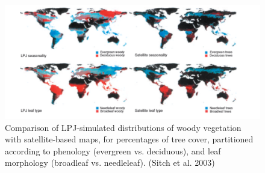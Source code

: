 \documentclass[12pt,oneside]{book}
\begin{document}
\begin{figure}

{\centering \includegraphics[width=0.8\linewidth]{figures/chap6/f66_LPJ_comparison_sitch} 

}

\caption{Comparison of LPJ-simulated distributions of woody vegetation with satellite-based maps, for percentages of tree cover, partitioned according to phenology (evergreen vs. deciduous), and leaf morphology (broadleaf vs. needleleaf). (Sitch et al. 2003)}\label{fig:f66}
\end{figure}
\end{document}
